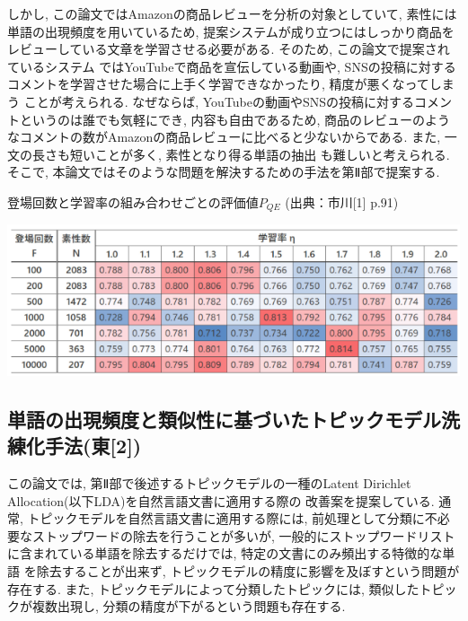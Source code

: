 \documentclass{ltjarticle}
\begin{document}
しかし, この論文ではAmazonの商品レビューを分析の対象としていて, 素性には単語の出現頻度を用いているため, 
提案システムが成り立つにはしっかり商品をレビューしている文章を学習させる必要がある. そのため, この論文で提案されているシステム
ではYouTubeで商品を宣伝している動画や, SNSの投稿に対するコメントを学習させた場合に上手く学習できなかったり, 精度が悪くなってしまう
ことが考えられる. なぜならば, YouTubeの動画やSNSの投稿に対するコメントというのは誰でも気軽にでき, 内容も自由であるため, 
商品のレビューのようなコメントの数がAmazonの商品レビューに比べると少ないからである. また, 一文の長さも短いことが多く, 素性となり得る単語の抽出
も難しいと考えられる. そこで, 本論文ではそのような問題を解決するための手法を第Ⅱ部で提案する.
\begin{table}
    \centering
    \caption{登場回数と学習率の組み合わせごとの評価値$P_{QE}$ (出典：市川[1] p.91)}
    \includegraphics[width=14cm]{images/table1.png}
    \label{table:関連研究1結果}
\end{table}
\vspace{20truept}

\subsection{単語の出現頻度と類似性に基づいたトピックモデル洗練化手法(東[2])}
この論文では, 第Ⅱ部で後述するトピックモデルの一種のLatent Dirichlet Allocation(以下LDA)を自然言語文書に適用する際の
改善案を提案している. 
通常, トピックモデルを自然言語文書に適用する際には, 前処理として分類に不必要なストップワードの除去を行うことが多いが, 
一般的にストップワードリストに含まれている単語を除去するだけでは, 特定の文書にのみ頻出する特徴的な単語
を除去することが出来ず, トピックモデルの精度に影響を及ぼすという問題が存在する. 
また, トピックモデルによって分類したトピックには, 類似したトピックが複数出現し, 
分類の精度が下がるという問題も存在する. 
\end{document}
